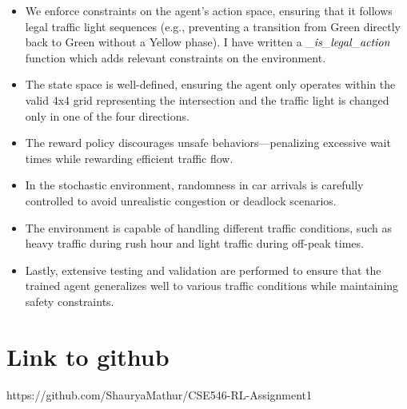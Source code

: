 \documentclass{article}
\begin{document}
\begin{itemize}
    \item We enforce constraints on the agent's action space, ensuring that it follows legal traffic light sequences (e.g., preventing a transition from Green directly back to Green without a Yellow phase). I have written a $\emph{\_is\_legal\_action}$ function which adds relevant constraints on the environment. 
    \item The state space is well-defined, ensuring the agent only operates within the valid 4x4 grid representing the intersection and the traffic light is changed only in one of the four directions. 
    \item The reward policy discourages unsafe behaviors—penalizing excessive wait times while rewarding efficient traffic flow. 
    \item In the stochastic environment, randomness in car arrivals is carefully controlled to avoid unrealistic congestion or deadlock scenarios. 
    \item The environment is capable of handling different traffic conditions, such as heavy traffic during rush hour and light traffic during off-peak times.
    \item Lastly, extensive testing and validation are performed to ensure that the trained agent generalizes well to various traffic conditions while maintaining safety constraints.\\
\end{itemize}

\section{Link to github}
https://github.com/ShauryaMathur/CSE546-RL-Assignment1
\end{document}

